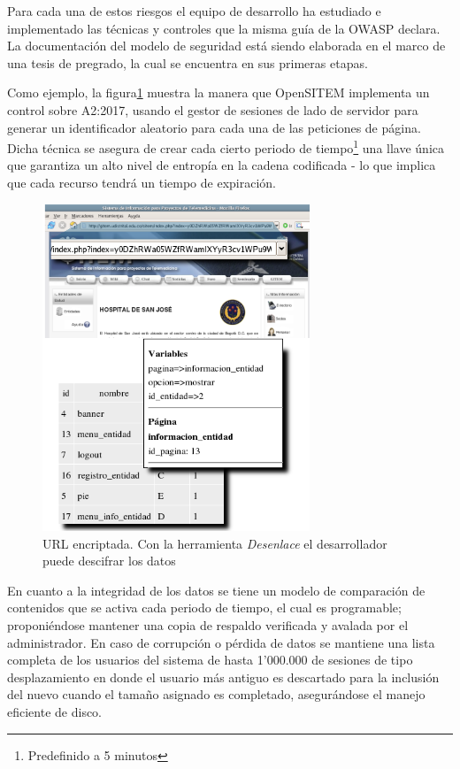 Para cada una de estos riesgos el equipo de desarrollo ha estudiado e implementado las técnicas y controles que la misma guía de la OWASP declara. La documentación del modelo de seguridad está siendo elaborada en el marco de una tesis de pregrado, la cual se encuentra en sus primeras etapas.

Como ejemplo, la figura\ref{desenlace} muestra la manera que OpenSITEM implementa un control sobre A2:2017, usando el gestor de sesiones de lado de servidor para generar un identificador aleatorio para cada una de las peticiones de página. Dicha técnica se asegura de crear cada cierto periodo de tiempo\footnote{Predefinido a 5 minutos} una llave única que garantiza un alto nivel de entropía en la cadena codificada - lo que implica que cada recurso tendrá un tiempo de expiración.

\begin{figure}
 \centering
 \includegraphics[width=80mm]{desenlace.png}
 \caption{URL encriptada. Con la herramienta \textit{Desenlace} el desarrollador puede descifrar los datos}
 \label{desenlace}
\end{figure}

En cuanto a la integridad de los datos se tiene un modelo de comparación de contenidos que se activa cada periodo de tiempo, el cual es programable; proponiéndose mantener una copia de respaldo verificada y avalada por el administrador. En caso de corrupción o pérdida de datos se mantiene una lista completa de los usuarios del sistema de hasta 1’000.000 de sesiones de tipo desplazamiento en donde el usuario más antiguo es descartado para la inclusión del nuevo cuando el tamaño asignado es completado, asegurándose el manejo eficiente de disco. 


